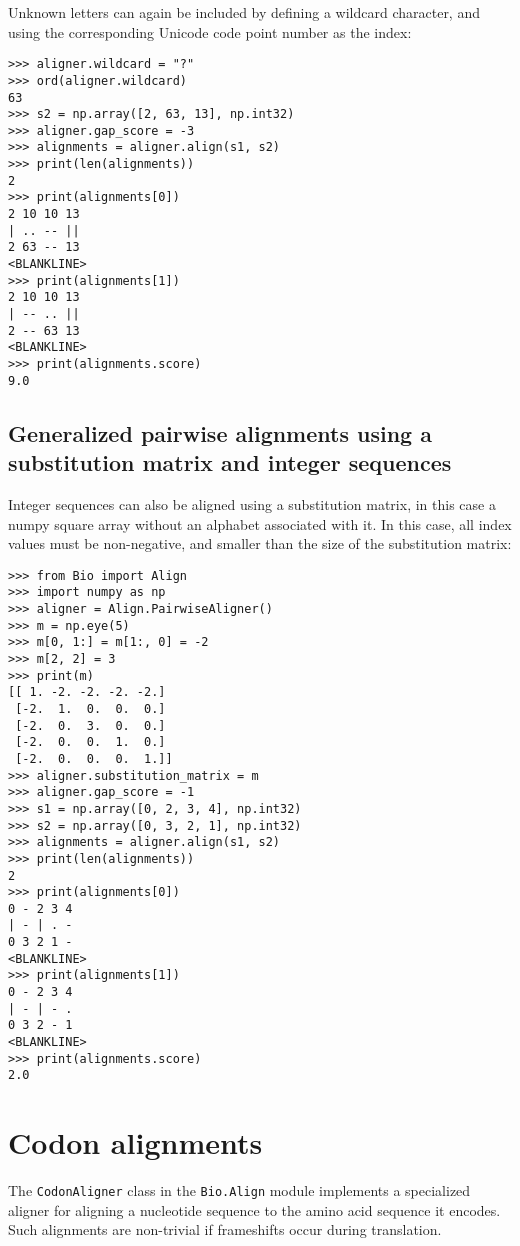 Unknown letters can again be included by defining a wildcard character, and using the corresponding Unicode code point number as the index:

\begin{verbatim}
>>> aligner.wildcard = "?"
>>> ord(aligner.wildcard)
63
>>> s2 = np.array([2, 63, 13], np.int32)
>>> aligner.gap_score = -3
>>> alignments = aligner.align(s1, s2)
>>> print(len(alignments))
2
>>> print(alignments[0])
2 10 10 13
| .. -- ||
2 63 -- 13
<BLANKLINE>
>>> print(alignments[1])
2 10 10 13
| -- .. ||
2 -- 63 13
<BLANKLINE>
>>> print(alignments.score)
9.0
\end{verbatim}

\subsection{Generalized pairwise alignments using a substitution matrix and integer sequences}

Integer sequences can also be aligned using a substitution matrix, in this case a numpy square array without an alphabet associated with it. In this case, all index values must be non-negative, and smaller than the size of the substitution matrix:

\begin{verbatim}
>>> from Bio import Align
>>> import numpy as np
>>> aligner = Align.PairwiseAligner()
>>> m = np.eye(5)
>>> m[0, 1:] = m[1:, 0] = -2
>>> m[2, 2] = 3
>>> print(m)
[[ 1. -2. -2. -2. -2.]
 [-2.  1.  0.  0.  0.]
 [-2.  0.  3.  0.  0.]
 [-2.  0.  0.  1.  0.]
 [-2.  0.  0.  0.  1.]]
>>> aligner.substitution_matrix = m
>>> aligner.gap_score = -1
>>> s1 = np.array([0, 2, 3, 4], np.int32)
>>> s2 = np.array([0, 3, 2, 1], np.int32)
>>> alignments = aligner.align(s1, s2)
>>> print(len(alignments))
2
>>> print(alignments[0])
0 - 2 3 4
| - | . -
0 3 2 1 -
<BLANKLINE>
>>> print(alignments[1])
0 - 2 3 4
| - | - .
0 3 2 - 1
<BLANKLINE>
>>> print(alignments.score)
2.0
\end{verbatim}

\section{Codon alignments}
\label{sec:codon_alignments}

The \verb+CodonAligner+ class in the \verb+Bio.Align+ module implements a specialized aligner for aligning a nucleotide sequence to the amino acid sequence it encodes. Such alignments are non-trivial if frameshifts occur during translation.

